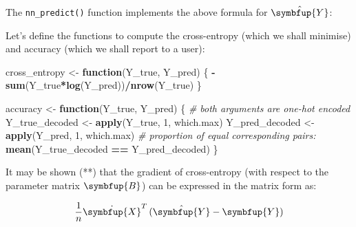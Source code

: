\documentclass[10pt,b5paper,krantz1]{krantz}
\newenvironment{Shaded}{\begin{snugshade}}{\end{snugshade}}
\newcommand{\CommentTok}[1]{\textcolor[rgb]{0.37,0.37,0.37}{\textit{#1}}}
\newcommand{\ControlFlowTok}[1]{\textcolor[rgb]{0.27,0.27,0.27}{\textbf{#1}}}
\newcommand{\DecValTok}[1]{\textcolor[rgb]{0.06,0.06,0.06}{#1}}
\newcommand{\KeywordTok}[1]{\textcolor[rgb]{0.27,0.27,0.27}{\textbf{#1}}}
\newcommand{\NormalTok}[1]{#1}
\newcommand{\OperatorTok}[1]{\textcolor[rgb]{0.43,0.43,0.43}{\textbf{#1}}}
\newcommand{\StringTok}[1]{\textcolor[rgb]{0.5,0.5,0.5}{#1}}
\renewcommand{\mathbf}[1]{\symbfup{#1}}
\begin{document}
The \texttt{nn\_predict()} function implements the above formula
for \(\hat{\mathbf{Y}}\):

\begin{Shaded}
\end{Shaded}

Let's define the functions to compute the cross-entropy
(which we shall minimise)
and accuracy (which we shall report to a user):

\begin{Shaded}
\begin{Highlighting}[]
\NormalTok{cross_entropy <-}\StringTok{ }\ControlFlowTok{function}\NormalTok{(Y_true, Y_pred) \{}
    \OperatorTok{-}\KeywordTok{sum}\NormalTok{(Y_true}\OperatorTok{*}\KeywordTok{log}\NormalTok{(Y_pred))}\OperatorTok{/}\KeywordTok{nrow}\NormalTok{(Y_true)}
\NormalTok{\}}

\NormalTok{accuracy <-}\StringTok{ }\ControlFlowTok{function}\NormalTok{(Y_true, Y_pred) \{}
    \CommentTok{# both arguments are one-hot encoded}
\NormalTok{    Y_true_decoded <-}\StringTok{ }\KeywordTok{apply}\NormalTok{(Y_true, }\DecValTok{1}\NormalTok{, which.max)}
\NormalTok{    Y_pred_decoded <-}\StringTok{ }\KeywordTok{apply}\NormalTok{(Y_pred, }\DecValTok{1}\NormalTok{, which.max)}
    \CommentTok{# proportion of equal corresponding pairs:}
    \KeywordTok{mean}\NormalTok{(Y_true_decoded }\OperatorTok{==}\StringTok{ }\NormalTok{Y_pred_decoded)}
\NormalTok{\}}
\end{Highlighting}
\end{Shaded}

It may be shown (**) that the gradient of cross-entropy
(with respect to the parameter matrix \(\mathbf{B}\))
can be expressed in the matrix form as:

\[
\frac{1}{n} \dot{\mathbf{X}}^T\, (\hat{\mathbf{Y}}-\mathbf{Y})
\]

\begin{Shaded}
\end{Shaded}
\end{document}
